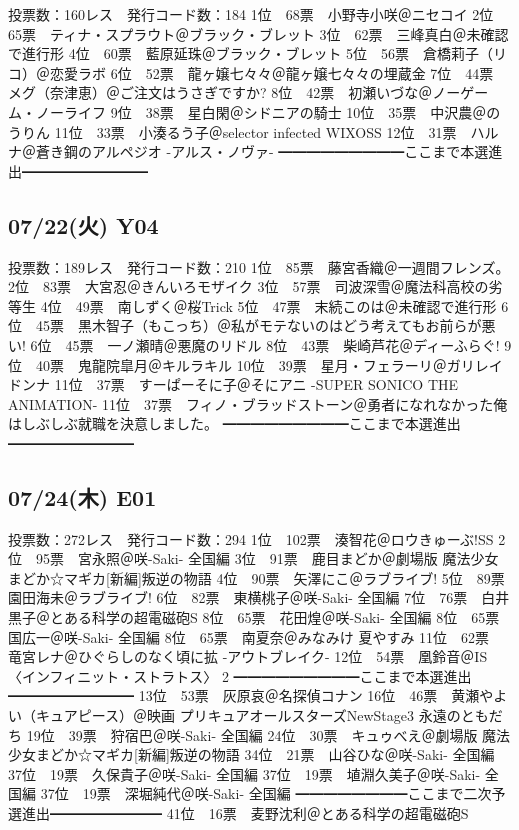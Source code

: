 	投票数：160レス　発行コード数：184
	1位　68票　小野寺小咲＠ニセコイ
	2位　65票　ティナ・スプラウト＠ブラック・ブレット
	3位　62票　三峰真白＠未確認で進行形
	4位　60票　藍原延珠＠ブラック・ブレット
	5位　56票　倉橋莉子（リコ）＠恋愛ラボ
	6位　52票　龍ヶ嬢七々々＠龍ヶ嬢七々々の埋蔵金
	7位　44票　メグ（奈津恵）＠ご注文はうさぎですか?
	8位　42票　初瀬いづな＠ノーゲーム・ノーライフ
	9位　38票　星白閑＠シドニアの騎士
	10位　35票　中沢農＠のうりん
	11位　33票　小湊るう子＠selector infected WIXOSS
	12位　31票　ハルナ＠蒼き鋼のアルペジオ -アルス・ノヴァ-
	━━━━━━━━━ここまで本選進出━━━━━━━━━

\subsection{07/22(火) Y04}

	投票数：189レス　発行コード数：210
	1位　85票　藤宮香織＠一週間フレンズ。
	2位　83票　大宮忍＠きんいろモザイク
	3位　57票　司波深雪＠魔法科高校の劣等生
	4位　49票　南しずく＠桜Trick
	5位　47票　末続このは＠未確認で進行形
	6位　45票　黒木智子（もこっち）＠私がモテないのはどう考えてもお前らが悪い!
	6位　45票　一ノ瀬晴＠悪魔のリドル
	8位　43票　柴崎芦花＠ディーふらぐ!
	9位　40票　鬼龍院皐月＠キルラキル
	10位　39票　星月・フェラーリ＠ガリレイドンナ
	11位　37票　すーぱーそに子＠そにアニ -SUPER SONICO THE ANIMATION-
	11位　37票　フィノ・ブラッドストーン＠勇者になれなかった俺はしぶしぶ就職を決意しました。
	━━━━━━━━━ここまで本選進出━━━━━━━━━

\subsection{07/24(木) E01}

	投票数：272レス　発行コード数：294
	1位　102票　湊智花＠ロウきゅーぶ!SS
	2位　95票　宮永照＠咲-Saki- 全国編
	3位　91票　鹿目まどか＠劇場版 魔法少女まどか☆マギカ[新編]叛逆の物語
	4位　90票　矢澤にこ＠ラブライブ!
	5位　89票　園田海未＠ラブライブ!
	6位　82票　東横桃子＠咲-Saki- 全国編
	7位　76票　白井黒子＠とある科学の超電磁砲S
	8位　65票　花田煌＠咲-Saki- 全国編
	8位　65票　国広一＠咲-Saki- 全国編
	8位　65票　南夏奈＠みなみけ 夏やすみ
	11位　62票　竜宮レナ＠ひぐらしのなく頃に拡 -アウトブレイク-
	12位　54票　凰鈴音＠IS〈インフィニット・ストラトス〉 2
	━━━━━━━━━ここまで本選進出━━━━━━━━━
	13位　53票　灰原哀＠名探偵コナン
	16位　46票　黄瀬やよい（キュアピース）＠映画 プリキュアオールスターズNewStage3 永遠のともだち
	19位　39票　狩宿巴＠咲-Saki- 全国編
	24位　30票　キュゥべえ＠劇場版 魔法少女まどか☆マギカ[新編]叛逆の物語
	34位　21票　山谷ひな＠咲-Saki- 全国編
	37位　19票　久保貴子＠咲-Saki- 全国編
	37位　19票　埴淵久美子＠咲-Saki- 全国編
	37位　19票　深堀純代＠咲-Saki- 全国編
	━━━━━━━━ここまで二次予選進出━━━━━━━━
	41位　16票　麦野沈利＠とある科学の超電磁砲S

